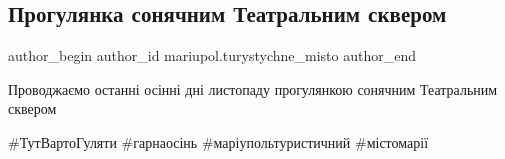  
 
 
 
 

\subsection{Прогулянка сонячним Театральним сквером}
\label{sec:24_11_2021.fb.mariupol.turystychne_misto.2.proguljanka_sonjachnym_teatralnym_skverom}

\ifcmt
 author_begin
   author_id mariupol.turystychne_misto
 author_end
\fi

Проводжаємо останні осінні дні листопаду прогулянкою сонячним Театральним сквером🍂

\#ТутВартоГуляти \#гарнаосінь \#маріупольтуристичний \#містомарії
